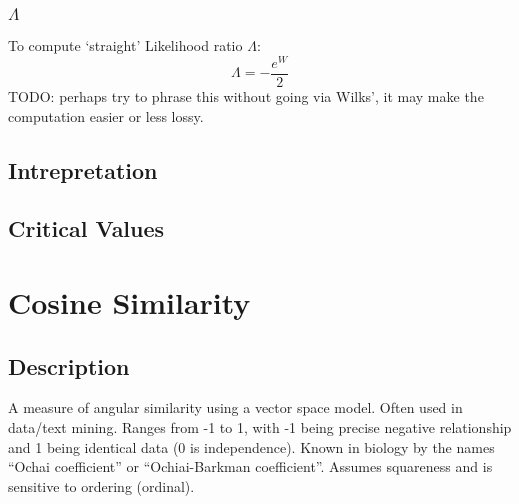 \documentclass[11pt]{article}
\begin{document}
\subsubsection{$\Lambda$}
To compute `straight' Likelihood ratio $\Lambda$:
$$
\Lambda = - \frac{ e^W }{ 2 }
$$
TODO: perhaps try to phrase this without going via Wilks', it may make the computation easier or less lossy.



\subsection{Intrepretation}

\subsection{Critical Values}
























\section{Cosine Similarity}
\label{section:cosine}
\subsection{Description}
A measure of angular similarity using a vector space model.  
Often used in data/text mining.  
Ranges from -1 to 1, with -1 being precise negative relationship and 1 being identical data (0 is independence).  
Known in biology by the names ``Ochai coefficient'' or ``Ochiai-Barkman coefficient''.  
Assumes squareness and is sensitive to ordering (ordinal).
\end{document}
